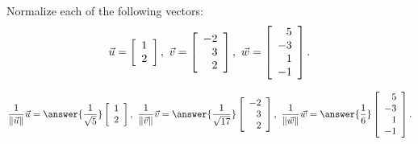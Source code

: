 \documentclass{ximera}
\author{Zack Reed}
\begin{document}
\begin{exercise}

  Normalize each of the following vectors:
  \begin{equation*}
    \vect{u}=\startmat{r}1\\2\stopmat, \quad
    \vect{v}=\startmat{r}-2\\3\\2\stopmat, \quad
    \vect{w}=\startmat{r}5\\-3\\1\\-1\stopmat.
  \end{equation*}

  \begin{equation*}
    \frac{1}{\norm{\vect{u}}}\vect{u} = \answer{\frac{1}{\sqrt{5}}}\startmat{r}1\\2\stopmat,\quad
    \frac{1}{\norm{\vect{v}}}\vect{v} = \answer{\frac{1}{\sqrt{17}}}\startmat{r}-2\\3\\2\stopmat,\quad
    \frac{1}{\norm{\vect{w}}}\vect{w} = \answer{\frac{1}{6}}\startmat{r}5\\-3\\1\\-1\stopmat.
  \end{equation*}

\end{exercise}
\end{document}
